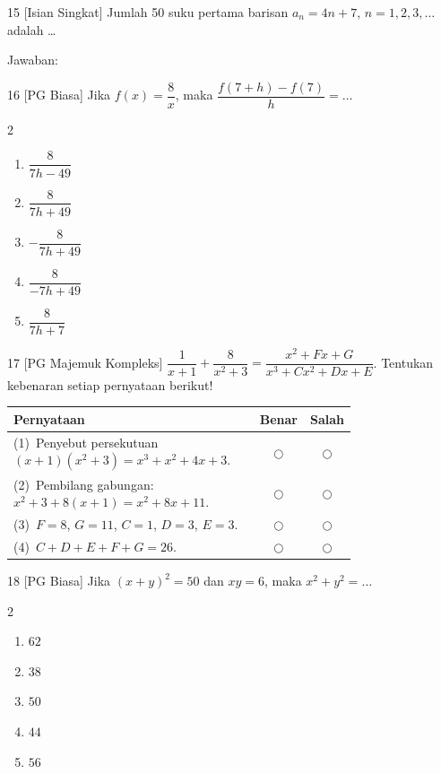 \documentclass[11pt]{article}
\newenvironment{pilB}{%
  \par\smallskip\begin{multicols}{2}
  \begin{enumerate}[label=(\alph*),leftmargin=*,itemsep=1pt,topsep=3pt]}%
  {\end{enumerate}\end{multicols}}
\begin{document}
\begin{soal}{15 \normalfont\small[Isian Singkat]}
Jumlah 50 suku pertama barisan $a_n=4n+7$, $n=1,2,3,\ldots$ adalah \ldots

\vspace{0.4em}\noindent Jawaban:\enspace\underline{\hspace{4cm}}
\end{soal}

\begin{soal}{16 \normalfont\small[PG Biasa]}
Jika $f(x)=\dfrac{8}{x}$, maka $\dfrac{f(7+h)-f(7)}{h}=\ldots$
\begin{pilB}
  \item $\dfrac{8}{7h-49}$ \item $\dfrac{8}{7h+49}$
  \item $-\dfrac{8}{7h+49}$ \item $\dfrac{8}{-7h+49}$
  \item $\dfrac{8}{7h+7}$
\end{pilB}
\end{soal}

\begin{soal}{17 \normalfont\small[PG Majemuk Kompleks]}
$\dfrac{1}{x+1}+\dfrac{8}{x^2+3}=\dfrac{x^2+Fx+G}{x^3+Cx^2+Dx+E}$.
Tentukan kebenaran setiap pernyataan berikut!

\par\smallskip
{\renewcommand{\arraystretch}{1.4}%
\begin{tabular}{@{}p{0.76\linewidth}cc@{}}
\hline\textbf{Pernyataan}&\textbf{Benar}&\textbf{Salah}\\\hline
(1)~Penyebut persekutuan $(x+1)(x^2+3)=x^3+x^2+4x+3$.&$\bigcirc$&$\bigcirc$\\
(2)~Pembilang gabungan: $x^2+3+8(x+1)=x^2+8x+11$.&$\bigcirc$&$\bigcirc$\\
(3)~$F=8$, $G=11$, $C=1$, $D=3$, $E=3$.&$\bigcirc$&$\bigcirc$\\
(4)~$C+D+E+F+G=26$.&$\bigcirc$&$\bigcirc$\\\hline
\end{tabular}}
\end{soal}

\begin{soal}{18 \normalfont\small[PG Biasa]}
Jika $(x+y)^2=50$ dan $xy=6$, maka $x^2+y^2=\ldots$
\begin{pilB}
  \item $62$ \item $38$ \item $50$ \item $44$ \item $56$
\end{pilB}
\end{soal}
\end{document}
